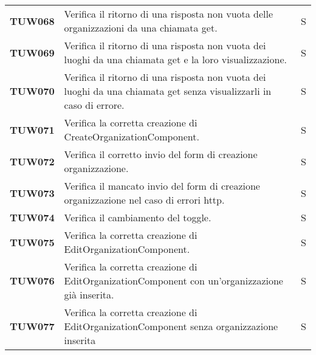 \documentclass[../../piano-di-qualifica.tex]{subfiles}
\begin{document}
\begin{longtable}[H]{>{\centering\bfseries}m{3cm} >{}m{10cm} >{\centering\arraybackslash}m{3cm}}
  TUW068             & Verifica il ritorno di una risposta non vuota delle organizzazioni da una chiamata get.                             & S                             \\

  TUW069             & Verifica il ritorno di una risposta non vuota dei luoghi da una chiamata get e la loro visualizzazione.             & S                             \\

  TUW070             & Verifica il ritorno di una risposta non vuota dei luoghi da una chiamata get senza visualizzarli in caso di errore. & S                             \\


  TUW071             & Verifica la corretta creazione di CreateOrganizationComponent.                                                      & S                             \\

  TUW072             & Verifica il corretto invio del form di creazione organizzazione.                                                    & S                             \\

  TUW073             & Verifica il mancato invio del form di creazione organizzazione nel caso di errori http.                             & S                             \\

  TUW074             & Verifica il cambiamento del toggle.                                                                                 & S                             \\


  TUW075             & Verifica la corretta creazione di EditOrganizationComponent.                                                        & S                             \\

  TUW076             & Verifica la corretta creazione di EditOrganizationComponent con un'organizzazione già inserita.                     & S                             \\

  TUW077             & Verifica la corretta creazione di EditOrganizationComponent senza organizzazione inserita                           & S                             \\


\end{longtable}
\end{document}
